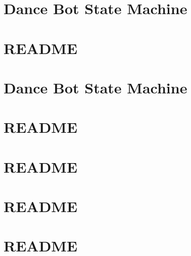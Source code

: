 \let\mypdfximage\pdfximage\def\pdfximage{\immediate\mypdfximage}\documentclass[twoside]{book}
\newcommand{\+}{\discretionary{\mbox{\scriptsize$\hookleftarrow$}}{}{}}
\begin{document}
\chapter{Dance Bot State Machine}
\label{md_smacc_sm_reference_library_sm_dance_bot_2_launch_readme}

\chapter{R\+E\+A\+D\+ME}
\label{md_smacc_sm_reference_library_sm_dance_bot_2_README}

\chapter{Dance Bot State Machine}
\label{md_smacc_sm_reference_library_sm_dance_bot_strikes_back_launch_readme}

\chapter{R\+E\+A\+D\+ME}
\label{md_smacc_sm_reference_library_sm_dance_bot_strikes_back_README}

\chapter{R\+E\+A\+D\+ME}
\label{md_smacc_sm_reference_library_sm_ferrari_README}

\chapter{R\+E\+A\+D\+ME}
\label{md_smacc_sm_reference_library_sm_fetch_screw_loop_1_README}

\chapter{R\+E\+A\+D\+ME}
\label{md_smacc_sm_reference_library_sm_fetch_six_table_pick_n_sort_1_README}

\end{document}
